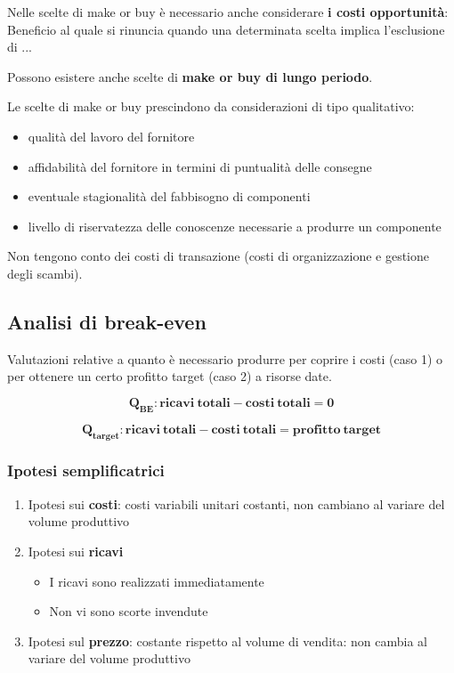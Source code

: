 \documentclass[../main.tex]{subfiles}
\begin{document}
Nelle scelte di make or buy è necessario anche considerare \textbf{i costi opportunità}: Beneficio al quale si rinuncia quando una determinata scelta implica l'esclusione di ...

Possono esistere anche scelte di \textbf{make or buy di lungo periodo}.

Le scelte di make or buy prescindono da considerazioni di tipo qualitativo:
\begin{itemize}
    \item qualità del lavoro del fornitore
    \item affidabilità del fornitore in termini di puntualità delle consegne
    \item eventuale stagionalità del fabbisogno di componenti
    \item livello di riservatezza delle conoscenze necessarie a produrre un componente
\end{itemize}
Non tengono conto dei costi di transazione (costi di organizzazione e gestione degli scambi).

\subsection{Analisi di break-even}

Valutazioni relative a quanto è necessario produrre per coprire i costi (caso 1) o per ottenere un certo profitto target (caso 2) a risorse date.

$$\mathbf{Q_{BE}: ricavi\ totali - costi\ totali = 0}$$

$$\mathbf{Q_{target}: ricavi\ totali - costi\ totali = profitto\ target}$$

\subsubsection{Ipotesi semplificatrici}
\begin{enumerate}
    \item Ipotesi sui \textbf{costi}: costi variabili unitari costanti, non cambiano al variare del volume produttivo
    \item Ipotesi sui \textbf{ricavi}
        \begin{itemize}
            \item I ricavi sono realizzati immediatamente
            \item Non vi sono scorte invendute
        \end{itemize}
    \item Ipotesi sul \textbf{prezzo}: costante rispetto al volume di vendita: non cambia al variare del volume produttivo
\end{enumerate}
\end{document}
